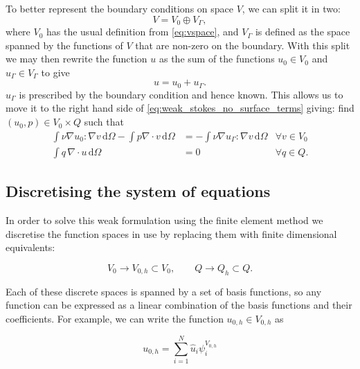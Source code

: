 \documentclass[thesis]{subfiles}
\begin{document}
To better represent the boundary conditions on space $V$, we can split it in two:
\begin{equation*}
  V = V_0 \oplus V_\Gamma,
\end{equation*}
where $V_0$ has the usual definition from \cref{eq:vspace}, and $V_\Gamma$ is defined as the space spanned by the functions of $V$ that are non-zero on the boundary.
With this split we may then rewrite the function $u$ as the sum of the functions $u_0 \in V_0$ and $u_\Gamma \in V_\Gamma$ to give
\begin{equation*}
  u = u_0 + u_\Gamma.
\end{equation*}
$u_\Gamma$ is prescribed by the boundary condition and hence known.
This allows us to move it to the right hand side of \cref{eq:weak_stokes_no_surface_terms} giving: find $(u_0, p) \in V_0 \times Q$ such that
\begin{equation} \label{eq:weak_stokes}
  \begin{aligned}
    \int \nu \nabla u_0 : \nabla v \, \textrm{d}\Omega
    - \int p \nabla \cdot v \, \textrm{d}\Omega
    &=
    - \int \nu \nabla u_\Gamma : \nabla v \, \textrm{d}\Omega
    &\forall v \in V_0 \\
    \int q \, \nabla \cdot u \, \textrm{d}\Omega
    &= 0
    &\forall q \in Q.
  \end{aligned}
\end{equation}

\subsection{Discretising the system of equations}

In order to solve this weak formulation using the finite element method we discretise the function spaces in use by replacing them with finite dimensional equivalents:

\begin{equation*}
  V_0 \to V_{0,h} \subset V_0,
  \quad
  \quad
  Q \to Q_h \subset Q.
\end{equation*}

Each of these discrete spaces is spanned by a set of basis functions, so any function can be expressed as a linear combination of the basis functions and their coefficients.
For example, we can write the function $u_{0,h} \in V_{0,h}$ as

\begin{equation*}
  u_{0,h} = \sum^N_{i=1} \hat u_i \psi^{V_{0,h}}_i
\end{equation*}
\end{document}
